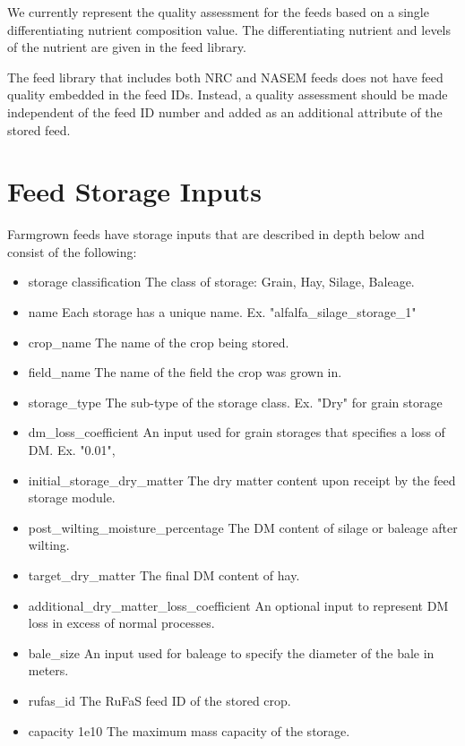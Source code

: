 \begin{refsection}
We currently represent the quality assessment for the feeds based on a single differentiating nutrient composition value. The differentiating nutrient and levels of the nutrient are given in the feed library.

The feed library that includes both NRC and NASEM feeds does not have feed quality embedded in the feed IDs. Instead, a quality assessment should be made independent of the feed ID number and added as an additional attribute of the stored feed. 

\section{Feed Storage Inputs}
Farmgrown feeds have storage inputs that are described in depth below and consist of the following:
\begin{itemize}
    \item storage classification The class of storage: Grain, Hay, Silage, Baleage.
    \item name  Each storage has a unique name. Ex. "alfalfa\_silage\_storage\_1"
    \item crop\_name The name of the crop being stored.
    \item field\_name    The name of the field the crop was grown in.
    \item storage\_type  The sub-type of the storage class. Ex. "Dry" for grain storage
    \item dm\_loss\_coefficient An input used for grain storages that specifies a loss of DM. Ex. "0.01",
    \item initial\_storage\_dry\_matter The dry matter content upon receipt by the feed storage module.
    \item post\_wilting\_moisture\_percentage The DM content of silage or baleage after wilting.
    \item target\_dry\_matter The final DM content of hay.
    \item additional\_dry\_matter\_loss\_coefficient An optional input to represent DM loss in excess of normal processes.
    \item bale\_size An input used for baleage to specify the diameter of the bale in meters.
    \item rufas\_id The RuFaS feed ID of the stored crop.
    \item capacity 1e10 The maximum mass capacity of the storage.
\end{itemize}


\end{refsection}
